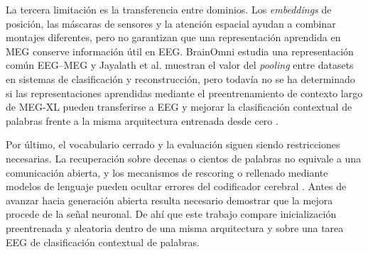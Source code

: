 La tercera limitación es la transferencia entre dominios. Los \textit{embeddings} de posición, las máscaras de sensores y la atención espacial ayudan a combinar montajes diferentes, pero no garantizan que una representación aprendida en MEG conserve información útil en EEG. BrainOmni estudia una representación común EEG--MEG y Jayalath et al. muestran el valor del \textit{pooling} entre datasets en sistemas de clasificación y reconstrucción, pero todavía no se ha determinado si las representaciones aprendidas mediante el preentrenamiento de contexto largo de MEG-XL pueden transferirse a EEG y mejorar la clasificación contextual de palabras frente a la misma arquitectura entrenada desde cero \cite{xiao2025brainomni,jayalath2025unlocking,jayalath2026megxl}.

Por último, el vocabulario cerrado y la evaluación siguen siendo restricciones necesarias. La recuperación sobre decenas o cientos de palabras no equivale a una comunicación abierta, y los mecanismos de rescoring o rellenado mediante modelos de lenguaje pueden ocultar errores del codificador cerebral \cite{jayalath2025unlocking}. Antes de avanzar hacia generación abierta resulta necesario demostrar que la mejora procede de la señal neuronal. De ahí que este trabajo compare inicialización preentrenada y aleatoria dentro de una misma arquitectura y sobre una tarea EEG de clasificación contextual de palabras.
